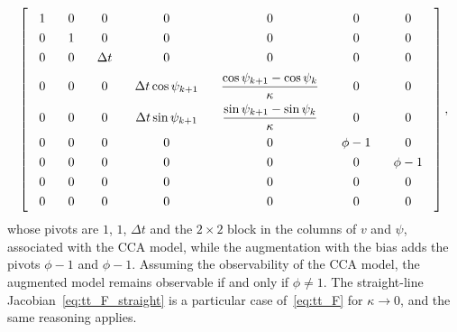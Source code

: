 \begin{equation}
    \renewcommand{\arraystretch}{1.3}
    \setlength{\arraycolsep}{9pt}
    \left[
    \begin{array}{ccccccc}
        1 & 0 & 0 & 0 & 0 & 0 & 0 \\
        0 & 1 & 0 & 0 & 0 & 0 & 0 \\
        0 & 0 & \Delta t & 0 & 0 & 0 & 0 \\[1ex]
        0 & 0 & 0 & \Delta t\cos\psi_{k+1} & \dfrac{\cos\psi_{k+1} - \cos\psi_k}{\kappa} & 0 & 0 \\[1.5ex]
        0 & 0 & 0 & \Delta t\sin\psi_{k+1} & \dfrac{\sin\psi_{k+1} - \sin\psi_k}{\kappa} & 0 & 0 \\[1ex]
        0 & 0 & 0 & 0 & 0 & \phi - 1 & 0 \\
        0 & 0 & 0 & 0 & 0 & 0 & \phi - 1 \\
        0 & 0 & 0 & 0 & 0 & 0 & 0 \\
        0 & 0 & 0 & 0 & 0 & 0 & 0
    \end{array}
    \right],
\end{equation}
whose pivots are $1$, $1$, $\Delta t$ and the $2\times2$ block in the columns of $v$ and
$\psi$, associated with the CCA model, while the augmentation with the bias adds the pivots
$\phi - 1$ and $\phi - 1$. Assuming the observability of the CCA model, the augmented model
remains observable if and only if $\phi \neq 1$.
The straight-line Jacobian~\eqref{eq:tt_F_straight} is a particular case of~\eqref{eq:tt_F}
for $\kappa \to 0$, and the same reasoning applies.
\vspace*{\fill}
